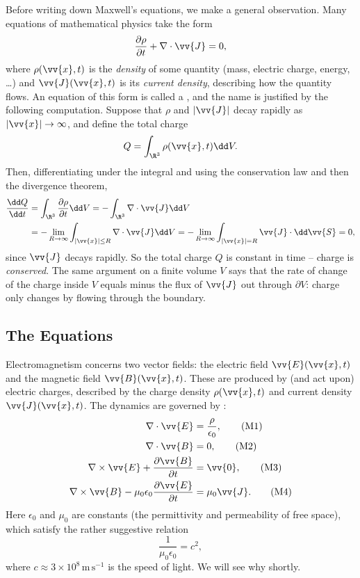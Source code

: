 Before writing down Maxwell's equations, we make a general observation. Many equations of mathematical physics take the form
$$
\frac{\partial \rho}{\partial t} + \nabla \cdot \vv{J} = 0,
$$
where $\rho(\vv{x}, t)$ is the \emph{density} of some quantity (mass, electric charge, energy, \dots) and $\vv{J}(\vv{x}, t)$ is its \emph{current density}, describing how the quantity flows. An equation of this form is called a , and the name is justified by the following computation. Suppose that $\rho$ and $|\vv{J}|$ decay rapidly as $|\vv{x}| \to \infty$, and define the total charge
$$
Q = \int_{\R^3} \rho(\vv{x}, t) \dd V.
$$
Then, differentiating under the integral and using the conservation law and then the divergence theorem,
\begin{align*}
	\frac{\dd Q}{\dd t} &= \int_{\R^3} \frac{\partial \rho}{\partial t} \dd V = -\int_{\R^3} \nabla \cdot \vv{J} \dd V \\
	&= -\lim_{R \to \infty} \int_{|\vv{x}| \leq R} \nabla \cdot \vv{J} \dd V = -\lim_{R \to \infty} \int_{|\vv{x}| = R} \vv{J} \cdot \dd \vv{S} = 0,
\end{align*}
since $\vv{J}$ decays rapidly. So the total charge $Q$ is constant in time -- charge is \emph{conserved}. The same argument on a finite volume $V$ says that the rate of change of the charge inside $V$ equals minus the flux of $\vv{J}$ out through $\partial V$: charge only changes by flowing through the boundary.

\subsection{The Equations}

Electromagnetism concerns two vector fields: the electric field $\vv{E}(\vv{x}, t)$ and the magnetic field $\vv{B}(\vv{x}, t)$. These are produced by (and act upon) electric charges, described by the charge density $\rho(\vv{x}, t)$ and current density $\vv{J}(\vv{x}, t)$. The dynamics are governed by :
\begin{align*}
	\nabla \cdot \vv{E} &= \frac{\rho}{\epsilon_0}, \tag{M1} \\
	\nabla \cdot \vv{B} &= 0, \tag{M2}\\
	\nabla \times \vv{E} + \frac{\partial \vv{B}}{\partial t} &= \vv{0}, \tag{M3}\\
	\nabla \times \vv{B} - \mu_0 \epsilon_0 \frac{\partial \vv{E}}{\partial t} &= \mu_0 \vv{J}. \tag{M4}
\end{align*}
Here $\epsilon_0$ and $\mu_0$ are constants (the permittivity and permeability of free space), which satisfy the rather suggestive relation
$$
\frac{1}{\mu_0 \epsilon_0} = c^2,
$$
where $c \approx 3 \times 10^8 \, \mathrm{m}\,\mathrm{s}^{-1}$ is the speed of light. We will see why shortly.

